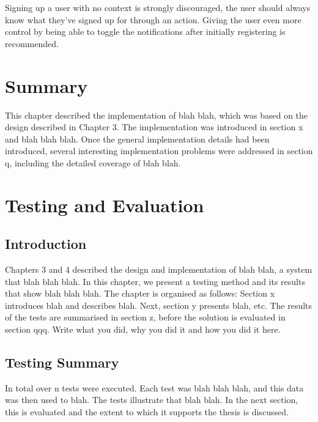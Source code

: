 Signing up a user with no context is strongly discouraged, the user should always know what they've signed up for through an action. Giving the user even more control by being able to toggle the notifications after initially registering is recommended. \cite{best_practises_push_notifications}



\section{Summary} \label{s-i--summary}

This chapter described the implementation of blah blah, which was based on the design described in Chapter 3. The implementation was introduced in section x and blah blah blah. Once the general implementation details had been introduced, several interesting implementation problems were addressed in section q, including the detailed coverage of blah blah.

\section{Testing and Evaluation} \label{s-i--testing-and-evaluation}

\subsection{Introduction}

Chapters 3 and 4 described the design and implementation of blah blah, a system that blah blah blah.  In this chapter, we present a testing method and its results that show blah blah blah.  The chapter is organised as follows:  Section x introduces blah and describes blah.  Next, section y presents blah, etc.
The results of the tests are summarised in section z, before the solution is evaluated in section qqq.
Write what you did, why you did it and how you did it here.

\subsection{Testing Summary}

In total over n tests were executed. Each test was blah blah blah, and this data was then used to blah. The tests illustrate that blah blah. In the next section, this is evaluated and the extent to which it supports the thesis is discussed.

